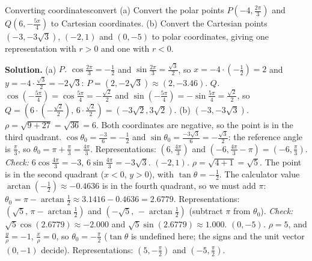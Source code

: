 \documentclass[11pt]{article}
\begin{document}
\begin{exmp}{Converting coordinates}{convert}
(a) Convert the polar points $P\left(-4,\frac{2\pi}3\right)$ and $Q\left(6,-\frac{5\pi}4\right)$ to Cartesian coordinates. (b) Convert the Cartesian points $(-3,-3\sqrt3)$, $(-2,1)$ and $(0,-5)$ to polar coordinates, giving one representation with $r>0$ and one with $r<0$.

\textbf{Solution.} (a) \emph{$P$.} $\cos\frac{2\pi}3=-\frac12$ and $\sin\frac{2\pi}3=\frac{\sqrt3}2$, so $x=-4\cdot\left(-\frac12\right)=2$ and $y=-4\cdot\frac{\sqrt3}2=-2\sqrt3$: $P=(2,-2\sqrt3)\approx(2,-3.46)$. \emph{$Q$.} $\cos\left(-\frac{5\pi}4\right)=\cos\frac{5\pi}4=-\frac{\sqrt2}2$ and $\sin\left(-\frac{5\pi}4\right)=-\sin\frac{5\pi}4=\frac{\sqrt2}2$, so $Q=\left(6\cdot\left(-\frac{\sqrt2}2\right),\,6\cdot\frac{\sqrt2}2\right)=\left(-3\sqrt2,3\sqrt2\right)$.
(b) \emph{$(-3,-3\sqrt3)$.} $\rho=\sqrt{9+27}=\sqrt{36}=6$. Both coordinates are negative, so the point is in the third quadrant. $\cos\theta_0=\frac{-3}6=-\frac12$ and $\sin\theta_0=\frac{-3\sqrt3}6=-\frac{\sqrt3}2$: the reference angle is $\frac\pi3$, so $\theta_0=\pi+\frac\pi3=\frac{4\pi}3$. Representations: $\left(6,\frac{4\pi}3\right)$ and $\left(-6,\frac{4\pi}3-\pi\right)=\left(-6,\frac\pi3\right)$. \emph{Check:} $6\cos\frac{4\pi}3=-3$, $6\sin\frac{4\pi}3=-3\sqrt3$.
\emph{$(-2,1)$.} $\rho=\sqrt{4+1}=\sqrt5$. The point is in the second quadrant ($x<0$, $y>0$), with $\tan\theta=-\frac12$. The calculator value $\arctan\left(-\frac12\right)\approx-0.4636$ is in the fourth quadrant, so we must add $\pi$: $\theta_0=\pi-\arctan\frac12\approx3.1416-0.4636=2.6779$. Representations: $\left(\sqrt5,\,\pi-\arctan\tfrac12\right)$ and $\left(-\sqrt5,\,-\arctan\tfrac12\right)$ (subtract $\pi$ from $\theta_0$). \emph{Check:} $\sqrt5\cos(2.6779)\approx-2.000$ and $\sqrt5\sin(2.6779)\approx1.000$.
\emph{$(0,-5)$.} $\rho=5$, and $\frac y\rho=-1$, $\frac x\rho=0$, so $\theta_0=-\frac\pi2$ ($\tan\theta$ is undefined here; the signs and the unit vector $(0,-1)$ decide). Representations: $\left(5,-\frac\pi2\right)$ and $\left(-5,\frac\pi2\right)$.
\end{exmp}
\end{document}
